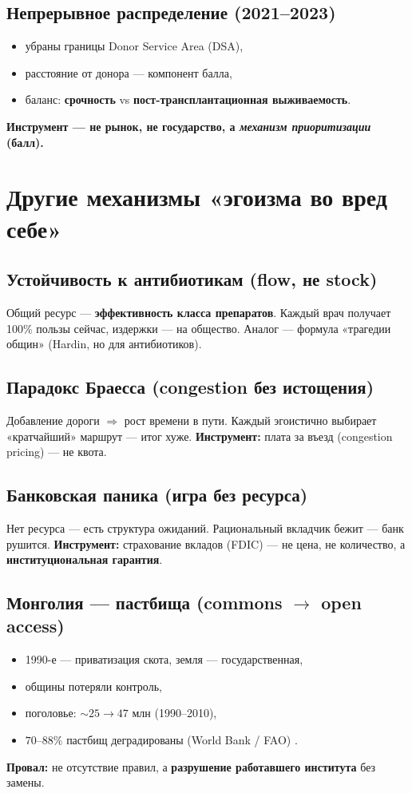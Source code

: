 \documentclass[12pt]{article}
\begin{document}
\subsection{Непрерывное распределение (2021--2023)}
\begin{itemize}
\item убраны границы Donor Service Area (DSA),
\item расстояние от донора — компонент балла,
\item баланс: \textbf{срочность} vs \textbf{пост-трансплантационная выживаемость}.
\end{itemize}

\textbf{Инструмент — не рынок, не государство, а \emph{механизм приоритизации} (балл).}

\section{Другие механизмы «эгоизма во вред себе»}

\subsection{Устойчивость к антибиотикам (flow, не stock)}
Общий ресурс — \textbf{эффективность класса препаратов}. Каждый врач получает 100\% пользы сейчас, издержки — на общество. Аналог — формула «трагедии общин» (Hardin, но для антибиотиков).

\subsection{Парадокс Браесса (congestion без истощения)}
Добавление дороги $\Rightarrow$ рост времени в пути. Каждый эгоистично выбирает «кратчайший» маршрут — итог хуже. \textbf{Инструмент:} плата за въезд (congestion pricing) — не квота.

\subsection{Банковская паника (игра без ресурса)}
Нет ресурса — есть структура ожиданий. Рациональный вкладчик бежит — банк рушится. \textbf{Инструмент:} страхование вкладов (FDIC) — не цена, не количество, а \textbf{институциональная гарантия}.

\subsection{Монголия — пастбища (commons $\to$ open access)}
\begin{itemize}
\item 1990-е — приватизация скота, земля — государственная,
\item общины потеряли контроль,
\item поголовье: $\sim 25 \to 47$ млн (1990--2010),
\item $70$--$88\%$ пастбищ деградированы (World Bank / FAO) \cite{worldbank2022mongolia}.
\end{itemize}
\textbf{Провал:} не отсутствие правил, а \textbf{разрушение работавшего института} без замены.
\end{document}
